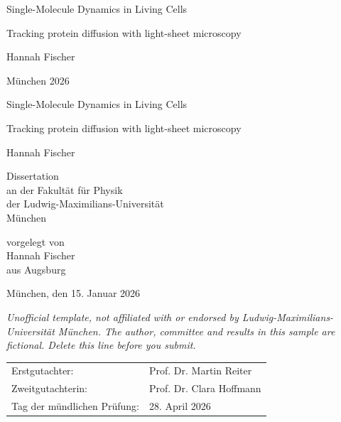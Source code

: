 \begin{titlepage}
\centering
\vspace*{1.5in}
{\LARGE Single-Molecule Dynamics in Living Cells\par}\vspace{0.2in}
{\large Tracking protein diffusion with light-sheet microscopy\par}\vspace{0.8in}
{\large Hannah Fischer\par}
\vfill
München 2026
\end{titlepage}
\begin{titlepage}
\centering
\begin{otherlanguage}{ngerman}
\vspace*{1in}
{\LARGE Single-Molecule Dynamics in Living Cells\par}\vspace{0.2in}
{\large Tracking protein diffusion with light-sheet microscopy\par}\vspace{0.4in}
{\large Hannah Fischer\par}\vspace{1in}
Dissertation\\
an der Fakultät für Physik\\
der Ludwig-Maximilians-Universität\\
München\par\vspace{0.5in}
vorgelegt von\\
Hannah Fischer\\
aus Augsburg\par\vspace{0.5in}
München, den 15. Januar 2026
\end{otherlanguage}
\vfill
{\footnotesize\itshape Unofficial template, not affiliated with or endorsed by Ludwig-Maximilians-Universität München. The author, committee and results in this sample are fictional. Delete this line before you submit.}
\end{titlepage}
\thispagestyle{empty}
\vspace*{\fill}
\begin{otherlanguage}{ngerman}
\noindent\begin{tabular}{@{}ll@{}}
Erstgutachter: & Prof. Dr. Martin Reiter\\
Zweitgutachterin: & Prof. Dr. Clara Hoffmann\\
Tag der mündlichen Prüfung: & 28. April 2026
\end{tabular}
\end{otherlanguage}
\clearpage
